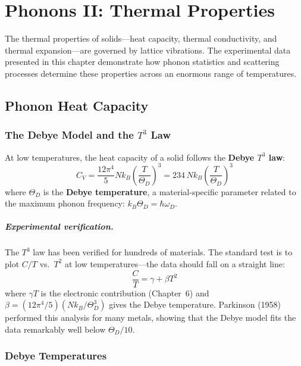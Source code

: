 \chapter{Phonons II: Thermal Properties}

The thermal properties of solids---heat capacity, thermal conductivity, and thermal expansion---are governed by lattice vibrations. The experimental data presented in this chapter demonstrate how phonon statistics and scattering processes determine these properties across an enormous range of temperatures.

\section{Phonon Heat Capacity}

\subsection{The Debye Model and the $T^3$ Law}

At low temperatures, the heat capacity of a solid follows the \textbf{Debye $T^3$ law}:
\begin{equation}
  C_V = \frac{12\pi^4}{5} N k_B \left(\frac{T}{\Theta_D}\right)^3 = 234\, N k_B \left(\frac{T}{\Theta_D}\right)^3
\end{equation}
where $\Theta_D$ is the \textbf{Debye temperature}, a material-specific parameter related to the maximum phonon frequency: $k_B \Theta_D = \hbar\omega_D$.

\paragraph{Experimental verification.} The $T^3$ law has been verified for hundreds of materials. The standard test is to plot $C/T$ vs.\ $T^2$ at low temperatures---the data should fall on a straight line:
\begin{equation}
  \frac{C}{T} = \gamma + \beta T^2
\end{equation}
where $\gamma T$ is the electronic contribution (Chapter~6) and $\beta = (12\pi^4/5)(Nk_B/\Theta_D^3)$ gives the Debye temperature. Parkinson (1958) performed this analysis for many metals, showing that the Debye model fits the data remarkably well below $\Theta_D/10$.

\subsection{Debye Temperatures}

